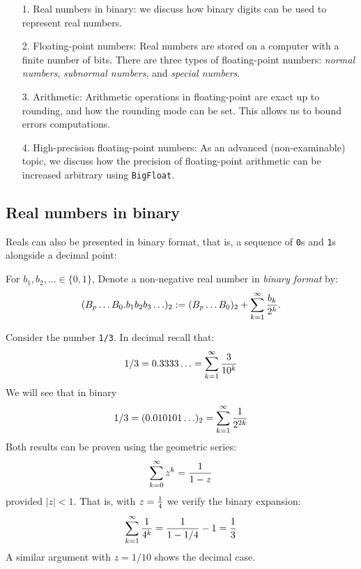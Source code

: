 \begin{itemize}
\item[1. ] Real numbers in binary: we discuss how binary digits can be used to represent real numbers.


\item[2. ] Floating-point numbers: Real numbers are stored on a computer with a finite number of bits.  There are three types of floating-point numbers: \emph{normal numbers}, \emph{subnormal numbers}, and \emph{special numbers}.


\item[3. ] Arithmetic: Arithmetic operations in floating-point are exact up to rounding, and how the rounding mode can be set. This allows us to bound  errors computations.


\item[4. ] High-precision floating-point numbers: As an advanced (non-examinable) topic, we discuss how the precision of floating-point arithmetic can be increased arbitrary using \texttt{BigFloat}. 

\end{itemize}
\subsection{Real numbers in binary}
Reals can also be presented in binary format, that is, a sequence of \texttt{0}s and \texttt{1}s alongside a decimal point:

\begin{definition} For $b_1,b_2,\ensuremath{\ldots}\in \{0,1\}$, Denote a non-negative real number in \emph{binary format} by:
\[
(B_p \ensuremath{\ldots}B_0.b_1b_2b_3\ensuremath{\ldots})_2 := (B_p \ensuremath{\ldots}B_0)_2 +  \sum_{k=1}^\ensuremath{\infty} {b_k \over 2^k}.
\]
\end{definition}

\begin{example} Consider the number \texttt{1/3}.  In decimal recall that:
\[
1/3 = 0.3333\ensuremath{\ldots}=  \sum_{k=1}^\ensuremath{\infty} {3 \over 10^k}
\]
We will see that in binary
\[
1/3 = (0.010101\ensuremath{\ldots})_2 = \sum_{k=1}^\ensuremath{\infty} {1 \over 2^{2k}}
\]
Both results can be proven using the geometric series:
\[
\sum_{k=0}^\ensuremath{\infty} z^k = {1 \over 1 - z}
\]
provided $|z| < 1$. That is, with $z = {1 \over 4}$ we verify the binary expansion:
\[
\sum_{k=1}^\ensuremath{\infty} {1 \over 4^k} = {1 \over 1 - 1/4} - 1 = {1 \over 3}
\]
A similar argument with $z = 1/10$ shows the decimal case. \end{example}


